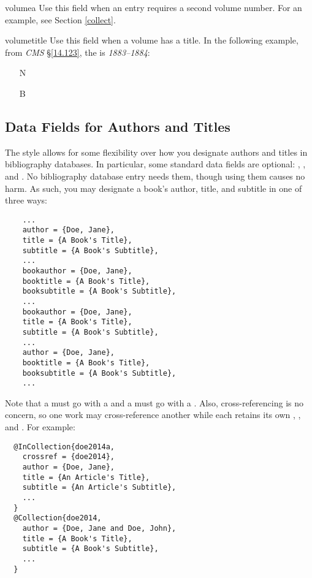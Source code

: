 \documentclass[11pt,letterpaper,oneside]{article}
\begin{document}
\begin{marglist}
\item[volumea] Use this field when an entry requires a second volume
number. For an example, see Section \ref{collect}.

\item[volumetitle] Use this field when a volume has a title. In the
following example, from \textit{CMS} \S\ref{14.123}, the
 is \textit{1883--1884}:

\begin{itemize}
\item[N] 

\item[B] 
\end{itemize}

\end{marglist}

\subsection{Data Fields for Authors and Titles}
\label{authtitles}

The style allows for some flexibility over how you designate authors
and titles in bibliography databases. In particular, some standard
data fields are optional: , ,
and . No bibliography database entry needs
them, though using them causes no harm. As such, you may designate a
book's author, title, and subtitle in one of three ways:

\begin{lstlisting}
    ...
    author = {Doe, Jane},
    title = {A Book's Title},
    subtitle = {A Book's Subtitle},
    ...
    bookauthor = {Doe, Jane},
    booktitle = {A Book's Title},
    booksubtitle = {A Book's Subtitle},
    ...
    bookauthor = {Doe, Jane},
    title = {A Book's Title},
    subtitle = {A Book's Subtitle},
    ...
    author = {Doe, Jane},
    booktitle = {A Book's Title},
    booksubtitle = {A Book's Subtitle},
    ...
\end{lstlisting}

\noindent Note that a  must go with a
 and a  must go with a
. Also, cross-referencing is no concern, so one
work may cross-reference another while each retains its own
, , and . For
example:

\begin{lstlisting}
  @InCollection{doe2014a,
    crossref = {doe2014},
    author = {Doe, Jane},
    title = {An Article's Title},
    subtitle = {An Article's Subtitle},
    ...
  }
  @Collection{doe2014,
    author = {Doe, Jane and Doe, John},
    title = {A Book's Title},
    subtitle = {A Book's Subtitle},
    ...
  }
\end{lstlisting}
\end{document}
